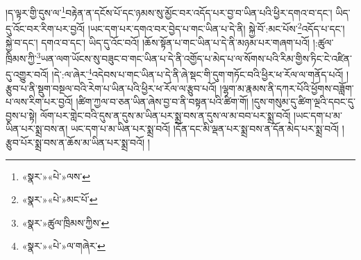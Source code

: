 །ད་ལྟར་གྱི་དུས་ལ་\footnote{«སྣར་»«པེ་»ལས་}བརྟེན་ན་དངོས་པོ་དང་ཉམས་སུ་མྱོང་བར་འདོད་པར་བྱ་བ་ཡིན་པའི་ཕྱིར་དགའ་བ་དང་། ཡིད་དུ་འོང་བར་རིག་པར་བྱའོ། །ཡང་དག་པར་དགའ་བར་བྱེད་པ་གང་ཡིན་པ་དེ་ནི། སྐྱེ་བོ་:མང་པོས་\footnote{«སྣར་»«པེ་»མང་པོ་}འདོད་པ་དང་། སྐྱེ་བ་དང་། དགའ་བ་དང་། ཡིད་དུ་འོང་བའོ། །ཆོས་སྟོན་པ་གང་ཡིན་པ་དེ་ནི་མཉམ་པར་གཞག་པའོ། །:ཚུལ་ཁྲིམས་ཀྱི་\footnote{«སྣར་»ཚུལ་ཁྲིམས་ཀྱིས་}ཡན་ལག་ཡོངས་སུ་བཟུང་བ་གང་ཡིན་པ་དེ་ནི་འགྱོད་པ་མེད་པ་ལ་སོགས་པའི་རིམ་གྱིས་ཏིང་ངེ་འཛིན་དུ་འགྱུར་བའོ། །དེ་:ལ་ཞེར་\footnote{«སྣར་»«པེ་»ལ་གཞེར་}འདེབས་པ་གང་ཡིན་པ་དེ་ནི་ཞེ་སྡང་གི་དུག་གཏོང་བའི་ཕྱིར་ཕ་རོལ་ལ་གནོད་པའོ། །རྩུབ་པ་ནི་སྡུག་བསྔལ་བའི་རེག་པ་ཡིན་པའི་ཕྱིར་ཕ་རོལ་ལ་རྩུབ་པའོ། །ལྷག་མ་རྣམས་ནི་དཀར་པོའི་ཕྱོགས་བཟློག་པ་ལས་རིག་པར་བྱའོ། །ཚིག་ཀྱལ་བ་ཅན་ཡིན་ཞེས་བྱ་བ་ནི་བསྟན་པའི་ཚིག་གོ། །དུས་གསུམ་དུ་ཚིག་ལྔའི་དབང་དུ་བྱས་པ་སྟེ། ལོག་པར་གླེང་བའི་དུས་ན་དུས་མ་ཡིན་པར་སྨྲ་བས་ན་དུས་ལ་མ་བབ་པར་སྨྲ་བའོ། །ཡང་དག་པ་མ་ཡིན་པར་སྨྲ་བས་ན། ཡང་དག་པ་མ་ཡིན་པར་སྨྲ་བའོ། །དོན་དང་མི་ལྡན་པར་སྨྲ་བས་ན་དོན་མེད་པར་སྨྲ་བའོ། །རྩུབ་པོར་སྨྲ་བས་ན་ཆོས་མ་ཡིན་པར་སྨྲ་བའོ། །
